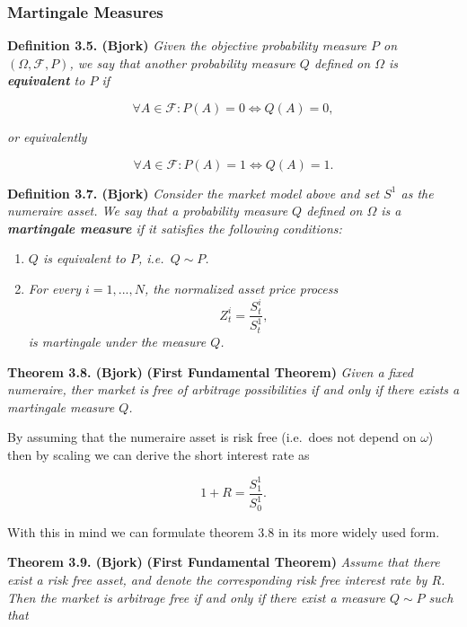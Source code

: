 \documentclass[a4paper,10pt,openany]{book}
\providecommand{\tightlist}{%
 \setlength{\itemsep}{0pt}\setlength{\parskip}{0pt}}
\begin{document}
\hypertarget{martingale-measures}{%
\subsubsection{Martingale Measures}\label{martingale-measures}}

\textbf{Definition 3.5. (Bjork)} \emph{Given the objective probability measure \(P\) on \((\Omega,\mathcal{F},P)\), we say that another probability measure \(Q\) defined on \(\Omega\) is \textbf{equivalent} to \(P\) if}

\[
\forall A\in\mathcal{F}:P(A)=0\iff Q(A)=0,
\]

\emph{or equivalently}

\[
\forall A\in\mathcal{F}:P(A)=1\iff Q(A)=1.
\]

\textbf{Definition 3.7. (Bjork)} \emph{Consider the market model above and set \(S^1\) as the numeraire asset. We say that a probability measure \(Q\) defined on \(\Omega\) is a \textbf{martingale measure} if it satisfies the following conditions:}

\begin{enumerate}
\def\labelenumi{\arabic{enumi}.}
\tightlist
\item
  \emph{\(Q\) is equivalent to \(P\), i.e.~\(Q\sim P\).}
\item
  \emph{For every \(i=1,...,N\), the normalized asset price process}
  \[
    Z_t^i=\frac{S_t^i}{S_t^1},
    \]
  \emph{is martingale under the measure \(Q\).}
\end{enumerate}

\textbf{Theorem 3.8. (Bjork)} \textbf{(First Fundamental Theorem)} \emph{Given a fixed numeraire, ther market is free of arbitrage possibilities if and only if there exists a martingale measure \(Q\).}

By assuming that the numeraire asset is risk free (i.e.~does not depend on \(\omega\)) then by scaling we can derive the short interest rate as

\[
1+R=\frac{S_1^1}{S_0^1}.
\]

With this in mind we can formulate theorem 3.8 in its more widely used form.

\textbf{Theorem 3.9. (Bjork)} \textbf{(First Fundamental Theorem)} \emph{Assume that there exist a risk free asset, and denote the corresponding risk free interest rate by \(R\). Then the market is arbitrage free if and only if there exist a measure \(Q\sim P\) such that}
\end{document}

